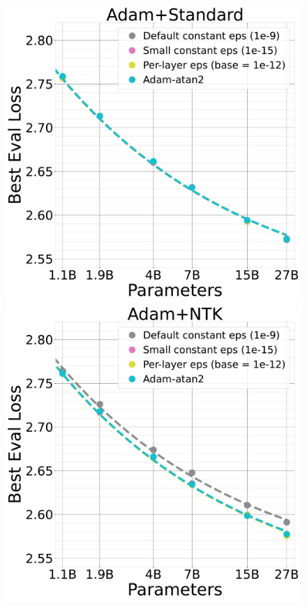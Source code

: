 \begin{figure}[ht]
    \begin{center}
        \includegraphics[width=0.48\linewidth, trim={0, 0, 0, 0},clip]{icml2024/figures/epsilon/stp_epsilon_eval_loss_comparisons_zoom6.pdf}
        \hfill
        \includegraphics[width=0.48\linewidth, trim={0, 0, 0, 0},clip]{icml2024/figures/epsilon/ntk_epsilon_eval_loss_comparisons_zoom6.pdf}
       
        \figvspace
       

\end{center}
\end{figure}
